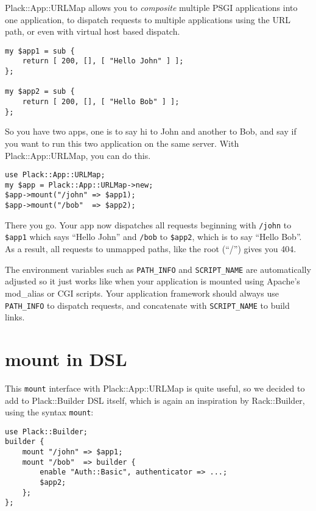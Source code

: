 Plack::App::URLMap allows you to \emph{composite} multiple PSGI
applications into one application, to dispatch requests to multiple
applications using the URL path, or even with virtual host based
dispatch.

\begin{lstlisting}
my $app1 = sub {
    return [ 200, [], [ "Hello John" ] ];
};

my $app2 = sub {
    return [ 200, [], [ "Hello Bob" ] ];
};
\end{lstlisting}

So you have two apps, one is to say hi to John and another to Bob, and
say if you want to run this two application on the same server. With
Plack::App::URLMap, you can do this.

\begin{lstlisting}
use Plack::App::URLMap;
my $app = Plack::App::URLMap->new;
$app->mount("/john" => $app1);
$app->mount("/bob"  => $app2);
\end{lstlisting}

There you go. Your app now dispatches all requests beginning with
\lstinline!/john! to \lstinline!$app1! which says ``Hello John'' and
\lstinline!/bob! to \lstinline!$app2!, which is to say ``Hello Bob''. As
a result, all requests to unmapped paths, like the root (``/'') gives
you 404.

The environment variables such as \lstinline!PATH_INFO! and
\lstinline!SCRIPT_NAME! are automatically adjusted so it just works like
when your application is mounted using Apache's mod\_alias or CGI
scripts. Your application framework should always use
\lstinline!PATH_INFO! to dispatch requests, and concatenate with
\lstinline!SCRIPT_NAME! to build links.

\section{mount in DSL}\label{mount-in-dsl}

This \lstinline!mount! interface with Plack::App::URLMap is quite
useful, so we decided to add to Plack::Builder DSL itself, which is
again an inspiration by Rack::Builder, using the syntax
\lstinline!mount!:

\begin{lstlisting}
use Plack::Builder;
builder {
    mount "/john" => $app1;
    mount "/bob"  => builder {
        enable "Auth::Basic", authenticator => ...;
        $app2;
    };
};
\end{lstlisting}

